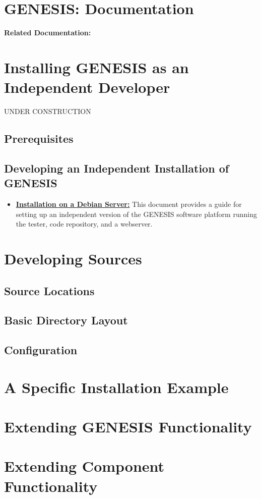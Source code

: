 \documentclass[12pt]{article}
\begin{document}
\section*{GENESIS: Documentation}

{\bf Related Documentation:}

\section*{Installing GENESIS as an Independent Developer}

UNDER CONSTRUCTION

\subsection*{Prerequisites}

\subsection*{Developing an Independent Installation of GENESIS}

\begin{itemize}
   \item[]\href{../installation-debian-server/installation-debian-server.tex}{\bf Installation on a Debian Server:} This document provides a guide for setting up an independent version of the GENESIS software platform running the tester, code repository, and a webserver.
\end{itemize}

\section*{Developing Sources}

\subsection*{Source Locations}

\subsection*{Basic Directory Layout}

\subsection*{Configuration}

\section*{A Specific Installation Example}

\section*{Extending GENESIS Functionality}

\section*{Extending Component Functionality}
\end{document}
